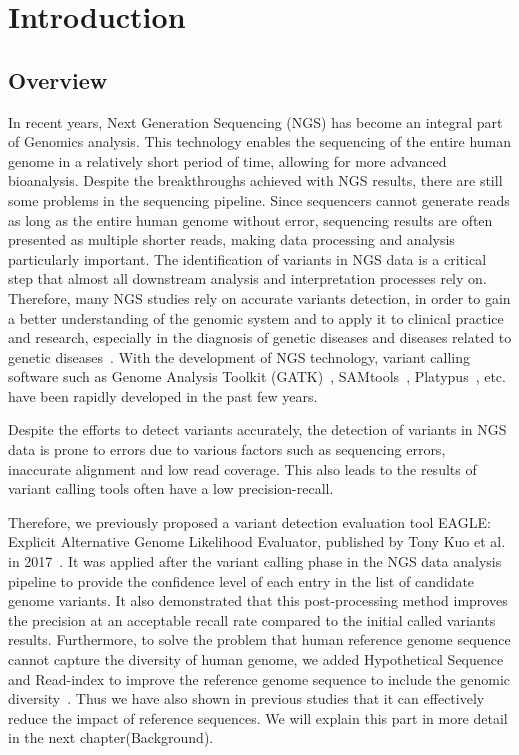 \documentclass[PhD]{PHlab-thesis}
\begin{document}
\printnomenclature[5cm]

\newpage
\setcounter{page}{1}



\chapter{Introduction}
\section{Overview}
In recent years, Next Generation Sequencing (NGS) has become an integral part of Genomics analysis. This technology enables the sequencing of the entire human genome in a relatively short period of time, allowing for more advanced bioanalysis. Despite the breakthroughs achieved with NGS results, there are still some problems in the sequencing pipeline. Since sequencers cannot generate reads as long as the entire human genome without error, sequencing results are often presented as multiple shorter reads, making data processing and analysis particularly important. The identification of variants in NGS data is a critical step that almost all downstream analysis and interpretation processes rely on. Therefore, many NGS studies rely on accurate variants detection, in order to gain a better understanding of the genomic system and to apply it to clinical practice and research, especially in the diagnosis of genetic diseases and diseases related to genetic diseases~\cite{Shashi2014NGS, Stenson2017NGS}. With the development of NGS technology, variant calling software such as Genome Analysis Toolkit (GATK)~\cite{McKenna2010GATK}, SAMtools~\cite{li2009SAMtools}, Platypus~\cite{Rimmer2014Platypus}, etc. have been rapidly developed in the past few years.

Despite the efforts to detect variants accurately, the detection of variants in NGS data is prone to errors due to various factors such as sequencing errors, inaccurate alignment and low read coverage. This also leads to the results of variant calling tools often have a low precision-recall. 

Therefore, we previously proposed a variant detection evaluation tool EAGLE: Explicit Alternative Genome Likelihood Evaluator, published by Tony Kuo et al. in 2017~\cite{Kuo2018EAGLE}. It was applied after the variant calling phase in the NGS data analysis pipeline to provide the confidence level of each entry in the list of candidate genome variants. It also demonstrated that this post-processing method improves the precision at an acceptable recall rate compared to the initial called variants results. Furthermore, to solve the problem that human reference genome sequence cannot capture the diversity of human genome, we added Hypothetical Sequence and Read-index to improve the reference genome sequence to include the genomic diversity~\cite{Chou2020HS, Su2021RI}. Thus we have also shown in previous studies that it can effectively reduce the impact of reference sequences. We will explain this part in more detail in the next chapter(Background).
\end{document}
